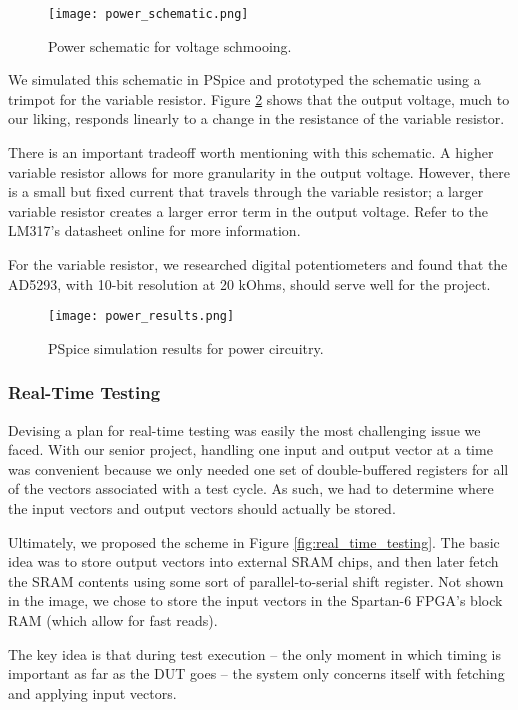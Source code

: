 \begin{figure}
\texttt{[image: power\_schematic.png]}
\caption{Power schematic for voltage schmooing.}
\label{fig:power_schematic}
\end{figure}

We simulated this schematic in PSpice and prototyped the schematic using a trimpot for the variable resistor. Figure \ref{fig:power_results} shows that the output voltage, much to our liking, responds linearly to a change in the resistance of the variable resistor.

There is an important tradeoff worth mentioning with this schematic. A higher variable resistor allows for more granularity in the output voltage. However, there is a small but fixed current that travels through the variable resistor; a larger variable resistor creates a larger error term in the output voltage. Refer to the LM317's datasheet online for more information.

For the variable resistor, we researched digital potentiometers and found that the AD5293, with 10-bit resolution at 20 kOhms, should serve well for the project.

\begin{figure}
\texttt{[image: power\_results.png]}
\caption{PSpice simulation results for power circuitry.}
\label{fig:power_results}
\end{figure}

\subsubsection{Real-Time Testing}
Devising a plan for real-time testing was easily the most challenging issue we faced. With our senior project, handling one input and output vector at a time was convenient because we only needed one set of double-buffered registers for all of the vectors associated with a test cycle. As such, we had to determine where the input vectors and output vectors should actually be stored.

Ultimately, we proposed the scheme in Figure \ref{fig:real_time_testing}. The basic idea was to store output vectors into external SRAM chips, and then later fetch the SRAM contents using some sort of parallel-to-serial shift register. Not shown in the image, we chose to store the input vectors in the Spartan-6 FPGA's block RAM (which allow for fast reads).

The key idea is that during test execution -- the only moment in which timing is important as far as the DUT goes -- the system only concerns itself with fetching and applying input vectors. 

